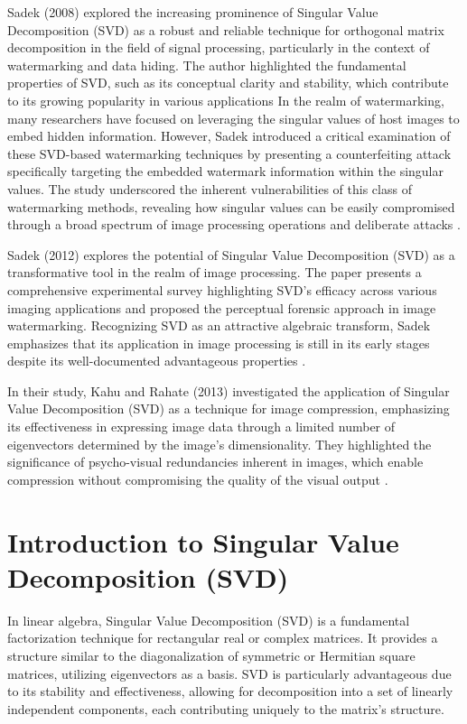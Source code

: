 \documentclass[
  journal,
]{IEEEtran}%
\begin{document}
Sadek (2008) explored the increasing prominence of Singular Value
Decomposition (SVD) as a robust and reliable technique for orthogonal
matrix decomposition in the field of signal processing, particularly in
the context of watermarking and data hiding. The author highlighted the
fundamental properties of SVD, such as its conceptual clarity and
stability, which contribute to its growing popularity in various
applications In the realm of watermarking, many researchers have focused
on leveraging the singular values of host images to embed hidden
information. However, Sadek introduced a critical examination of these
SVD-based watermarking techniques by presenting a counterfeiting attack
specifically targeting the embedded watermark information within the
singular values. The study underscored the inherent vulnerabilities of
this class of watermarking methods, revealing how singular values can be
easily compromised through a broad spectrum of image processing
operations and deliberate attacks
.

Sadek (2012) explores the potential of Singular Value Decomposition
(SVD) as a transformative tool in the realm of image processing. The
paper presents a comprehensive experimental survey highlighting SVD's
efficacy across various imaging applications and proposed the perceptual
forensic approach in image watermarking. Recognizing SVD as an
attractive algebraic transform, Sadek emphasizes that its application in
image processing is still in its early stages despite its
well-documented advantageous properties
.

In their study, Kahu and Rahate (2013) investigated the application of
Singular Value Decomposition (SVD) as a technique for image compression,
emphasizing its effectiveness in expressing image data through a limited
number of eigenvectors determined by the image's dimensionality. They
highlighted the significance of psycho-visual redundancies inherent in
images, which enable compression without compromising the quality of the
visual output .

\section{Introduction to Singular Value Decomposition
(SVD)}\label{introduction-to-singular-value-decomposition-svd}

In linear algebra, Singular Value Decomposition (SVD) is a fundamental
factorization technique for rectangular real or complex matrices. It
provides a structure similar to the diagonalization of symmetric or
Hermitian square matrices, utilizing eigenvectors as a basis. SVD is
particularly advantageous due to its stability and effectiveness,
allowing for decomposition into a set of linearly independent
components, each contributing uniquely to the matrix's structure.
\end{document}
